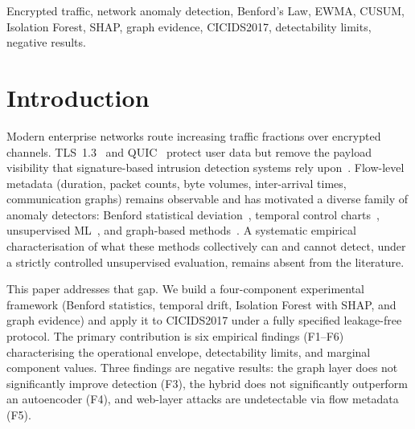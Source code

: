 \documentclass[journal,10pt,twoside]{IEEEtran}
\begin{document}
\begin{IEEEkeywords}
Encrypted traffic, network anomaly detection, Benford's Law,
EWMA, CUSUM, Isolation Forest, SHAP, graph evidence, CICIDS2017,
detectability limits, negative results.
\end{IEEEkeywords}

\section{Introduction}
\label{sec:intro}

Modern enterprise networks route increasing traffic fractions over
encrypted channels.  TLS~1.3~\cite{rescorla2018tls} and
QUIC~\cite{iyengar2021quic} protect user data but remove the payload
visibility that signature-based intrusion detection systems rely
upon~\cite{nguyen2023diet,rahman2023lstma}.
Flow-level metadata (duration, packet counts, byte volumes,
inter-arrival times, communication graphs) remains observable and
has motivated a diverse family of anomaly detectors: Benford
statistical deviation~\cite{mbona2023benford,campanelli2023euclidean},
temporal control charts~\cite{pliu2023cusum,chen2023ewma},
unsupervised ML~\cite{kim2023unsupervised,zhang2024adaptive}, and
graph-based methods~\cite{lo2023egraphsage,siddiqui2024dynamic}.
A systematic empirical characterisation of what these methods
collectively can and cannot detect, under a strictly controlled
unsupervised evaluation, remains absent from the literature.

This paper addresses that gap.  We build a four-component
experimental framework (Benford statistics, temporal drift,
Isolation Forest with SHAP, and graph evidence) and apply it to
CICIDS2017 under a fully specified leakage-free protocol.  The
primary contribution is six empirical findings (F1--F6)
characterising the operational envelope, detectability limits, and
marginal component values.  Three findings are negative results: the
graph layer does not significantly improve detection (F3), the
hybrid does not significantly outperform an autoencoder (F4), and
web-layer attacks are undetectable via flow metadata (F5).
\end{document}
